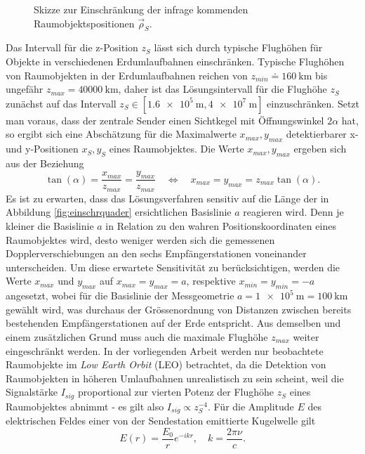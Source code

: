 \documentclass[a4paper,12pt]{article}
\numberwithin{equation}{section}
\begin{document}
\begin{figure}[h]
\caption{Skizze zur Einschränkung der infrage kommenden Raumobjektspositionen $\vec{\rho}_S$.}
\label{fig:einschr}
\end{figure} Das Intervall für die z-Position $z_S$ lässt sich durch typische Flughöhen für Objekte in verschiedenen Erdumlaufbahnen einschränken. Typische Flughöhen von Raumobjekten in der Erdumlaufbahnen reichen von $z_{min} \doteq \SI{160}{\kilo\meter}$ bis ungefähr $z_{max} = \SI{40000}{\kilo\meter}$, daher ist das Lösungsintervall für die Flughöhe $z_S$ zunächst auf das Intervall $z_S \in [\SI{1.6e5}{\meter},\SI{4e7}{\meter}]$ einzuschränken. Setzt man voraus, dass der zentrale Sender einen Sichtkegel mit Öffnungswinkel $2\alpha$ hat, so ergibt sich eine Abschätzung für die Maximalwerte $x_{max}, y_{max}$ detektierbarer x- und y-Positionen $x_S, y_S$ eines Raumobjektes. Die Werte $x_{max}, y_{max}$ ergeben sich aus der Beziehung \begin{equation}
\tan(\alpha) = \frac{x_{max}}{z_{max}} = \frac{y_{max}}{z_{max}} \quad \Leftrightarrow \quad x_{max} = y_{max} = z_{max}\tan(\alpha).
\end{equation} Es ist zu erwarten, dass das Lösungsverfahren sensitiv auf die Länge der in Abbildung \ref{fig:einschrquader} ersichtlichen Basislinie $a$ reagieren wird. Denn je kleiner die Basislinie $a$ in Relation zu den wahren Positionskoordinaten eines Raumobjektes wird, desto weniger werden sich die gemessenen Dopplerverschiebungen an den sechs Empfängerstationen voneinander unterscheiden. Um diese erwartete Sensitivität zu berücksichtigen, werden die Werte $x_{max}$ und $y_{max}$ auf $x_{max} = y_{max} = a$, respektive $x_{min} = y_{min} = -a$ angesetzt, wobei für die Basislinie der Messgeometrie $a = \SI{1e5}{\meter} = \SI{100}{\kilo\meter}$ gewählt wird, was durchaus der Grössenordnung von Distanzen zwischen bereits bestehenden Empfängerstationen auf der Erde entspricht. Aus demselben und einem zusätzlichen Grund muss auch die maximale Flughöhe $z_{max}$ weiter eingeschränkt werden. In der vorliegenden Arbeit werden nur beobachtete Raumobjekte im \textit{Low Earth Orbit} (LEO) betrachtet, da die Detektion von Raumobjekten in höheren Umlaufbahnen unrealistisch zu sein scheint, weil die Signalstärke $I_{sig}$ proportional zur vierten Potenz der Flughöhe $z_S$ eines Raumobjektes abnimmt - es gilt also $I_{sig} \propto z_S^{-4}$. Für die Amplitude $E$ des elektrischen Feldes einer von der Sendestation emittierte Kugelwelle gilt \begin{equation}
E(r) = \frac{E_0}{r}e^{-ikr}, \quad k = \frac{2\pi\nu}{c}.

\end{equation}
\end{document}
